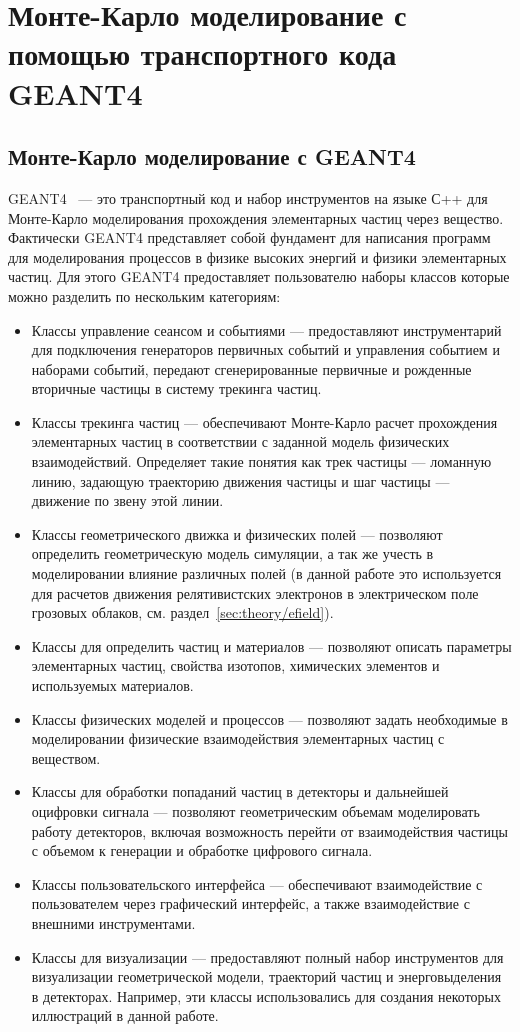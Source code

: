 \chapter{Монте-Карло моделирование с помощью транспортного кода GEANT4}\label{ch:theory}

\section{Монте-Карло моделирование с GEANT4
}\label{sec:theory/geant4}
GEANT4~\cite{Geant2006, Geant2016, Geant2003, collaboration2016physics, collaboration2012geant4} --- это транспортный код и набор инструментов на языке С++ для Монте-Карло моделирования прохождения элементарных частиц через вещество. Фактически GEANT4 представляет собой фундамент для написания программ для моделирования процессов в физике высоких энергий и физики элементарных частиц. Для этого GEANT4 предоставляет пользователю наборы классов которые можно разделить по нескольким категориям: 
\begin{itemize}
    \item Классы управление сеансом и событиями --- предоставляют инструментарий для подключения генераторов первичных событий и управления событием и наборами событий, передают сгенерированные первичные и рожденные вторичные частицы в систему трекинга частиц.
    \item Классы трекинга частиц --- обеспечивают Монте-Карло расчет прохождения элементарных частиц в соответствии с заданной модель физических взаимодействий. Определяет такие понятия как трек частицы --- ломанную линию, задающую траекторию движения частицы и шаг частицы --- движение по звену этой линии. 
    \item Классы геометрического движка и физических полей --- позволяют определить геометрическую модель симуляции, а так же учесть в моделировании влияние различных полей (в данной работе это используется для расчетов движения релятивистских электронов в электрическом поле грозовых облаков, см. раздел~\ref{sec:theory/efield}).
    \item Классы для определить частиц и материалов --- позволяют описать параметры элементарных частиц, свойства изотопов, химических элементов и используемых материалов.
    \item Классы физических моделей и процессов --- позволяют задать необходимые в моделировании физические взаимодействия элементарных частиц с веществом.
    \item Классы для обработки попаданий частиц в детекторы и дальнейшей оцифровки сигнала --- позволяют геометрическим объемам моделировать работу  детекторов, включая возможность перейти от взаимодействия частицы с объемом к генерации и обработке цифрового сигнала.
    \item Классы пользовательского интерфейса --- обеспечивают взаимодействие с пользователем через графический интерфейс, а также взаимодействие с внешними инструментами.
    \item Классы для визуализации --- предоставляют полный набор инструментов для визуализации геометрической модели, траекторий частиц и энерговыделения в детекторах. Например, эти классы использовались для создания некоторых иллюстраций в данной работе.
\end{itemize}
